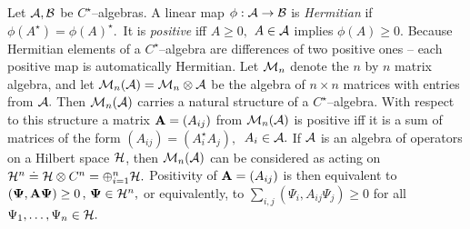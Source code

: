 \documentclass[12pt]{article}
\begin{document}
Let ${\cal A, B}$ be $C^{\star}$--algebras.  A linear map $\phi :  {\cal A}
\rightarrow {\cal B}$ is {\sl Hermitian} if $\phi  (A^{\star}) = \phi
 (A)^{\star }. $\ It is {\sl positive} iff $A\geq 0 , $ $A\in {\cal A}$ implies $
\phi  (A)\geq 0 . $ Because Hermitian elements of a $C^{\star}$--algebra are
differences of two positive ones -- each positive map is automatically
Hermitian.  Let ${\cal M}_n$ denote the $n$ by $n$ matrix algebra,  and let $
{\cal M}_n ({\cal A}) = {\cal M}_n \otimes {\cal A}$ be the 
algebra of $n\times n$ matrices with entries from ${\cal A}. $ Then 
$
{\cal M}_n ({\cal A})$ carries a natural structure of a $C^{\star}$--algebra.  
With respect to this structure a  matrix ${\bf 
A}= (A_{ij})$ from ${\cal M}_n  ({\cal A})$ is positive iff it is  a sum of
matrices of the form $ (A_{ij}) =  (A_i^{\star } A_j ), \,  $ $A_i\in {\cal A} . $ 
If ${\cal 
A}$ is an algebra of operators on a Hilbert space ${\cal H}$,  then ${\cal M}
_n ({\cal A})$ can be considered as acting on ${\cal H}^n \doteq {\cal H}
\otimes C^n = \oplus_{i=1}^n {\cal H} . $ Positivity of ${\bf A}= (A_{ij})$ is
then equivalent to $ ({\bf \Psi}, {\bf A} {\bf \Psi} )\geq 0\,  ,  \,  {\bf \Psi}
\in {\cal H}^n ,  $ or equivalently,  to $\sum_{i, j}  (\Psi_i ,  A_{ij} \Psi_j
) \geq 0 $ for all $\Psi_1, \ldots , \Psi_n \in {\cal H} . $
\end{document}
